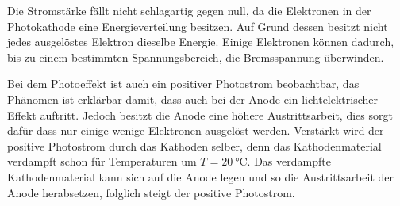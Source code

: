Die Stromstärke fällt nicht schlagartig gegen null, da die Elektronen in der Photokathode
eine Energieverteilung besitzen. Auf Grund dessen besitzt nicht jedes ausgelöstes
Elektron dieselbe Energie. Einige Elektronen können dadurch, bis zu einem bestimmten Spannungsbereich,
die Bremsspannung überwinden.

Bei dem Photoeffekt ist auch ein positiver Photostrom beobachtbar, das
Phänomen ist erklärbar damit, dass auch bei der Anode ein lichtelektrischer Effekt
auftritt. Jedoch besitzt die Anode eine höhere Austrittsarbeit, dies sorgt
dafür dass nur einige wenige Elektronen ausgelöst werden.
Verstärkt wird der positive Photostrom durch das Kathoden selber, %
denn das Kathodenmaterial verdampft schon für Temperaturen um
$T=\SI{20}{\celsius}$. Das verdampfte Kathodenmaterial kann sich auf die
Anode legen und so die Austrittsarbeit der Anode herabsetzen, folglich steigt der
positive Photostrom.
